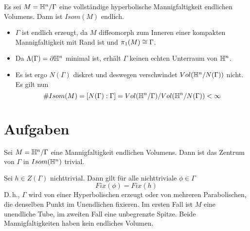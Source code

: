 \documentclass{book}
\begin{document}
\Kor{}
Es sei $M = \mathbb{H}^n / \Gamma$ eine vollständige hyperbolische Mannigfaltigkeit endlichen Volumens. Dann ist $Isom(M)$ endlich.
\begin{Beweis}{}
	\begin{itemize}
		\item $\Gamma$ ist endlich erzeugt, da $M$ diffeomorph zum Inneren einer kompakten Mannigfaltigkeit mit Rand ist und $\pi_1(M) \overset{}{\cong} \Gamma$.
		\item Da $\Lambda(\Gamma) = \partial \mathbb{H}^n$ minimal ist, erhält $\Gamma$ keinen echten Unterraum von $\mathbb{H}^n$.
		\item Es ist ergo $N(\Gamma)$ diskret und deswegen verschwindet $Vol(\mathbb{H}^n / N(\Gamma))$ nicht. Es gilt nun
		\[ \# Isom(M) = [N(\Gamma) : \Gamma] = Vol(\mathbb{H}^n /\Gamma) / Vol(\mathbb{H}^n / N(\Gamma)) < \infty \]
	\end{itemize}
\end{Beweis}
 

\chapter{Aufgaben}
\Lem{}
Sei $M = \mathbb{H}^n / \Gamma$ eine Mannigfaltigkeit endlichen Volumens. Dann ist das Zentrum von $\Gamma$ in $Isom(\mathbb{H}^n)$ trivial.
\begin{Beweis}{}
	Sei $h \in Z(\Gamma)$ nichttrivial. Dann gilt für alle nichttriviale $\phi \in \Gamma$
	\[ Fix(\phi) = Fix(h) \]
	D.\,h., $\Gamma$ wird von einer Hyperbolischen erzeugt oder von mehreren Parabolischen, die denselben Punkt im Unendlichen fixieren. Im ersten Fall ist $M$ eine unendliche Tube, im zweiten Fall eine unbegrenzte Spitze. Beide Mannigfaltigkeiten haben kein endliches Volumen.
\end{Beweis}




\printindex
\end{document}
